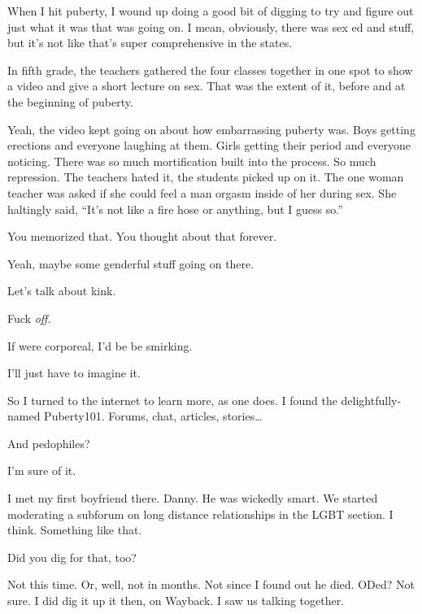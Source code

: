 \begin{paracol}{2}
\begin{leftcolumn}
\noindent When I hit puberty, I wound up doing a good bit of digging to try and figure out just what it was that was going on. I mean, obviously, there was sex ed and stuff, but it's not like that's super comprehensive in the states.

\begin{ally}
In fifth grade, the teachers gathered the four classes together in one spot to show a video and give a short lecture on sex. That was the extent of it, before and at the beginning of puberty.
\end{ally}
Yeah, the video kept going on about how embarrassing puberty was. Boys getting erections and everyone laughing at them. Girls getting their period and everyone noticing. There was so much mortification built into the process. So much repression. The teachers hated it, the students picked up on it. The one woman teacher was asked if she could feel a man orgasm inside of her during sex. She haltingly said, ``It's not like a fire hose or anything, but I guess so.''

\begin{ally}
You memorized that. You thought about that forever.
\end{ally}
Yeah, maybe some genderful stuff going on there.

\begin{ally}
Let's talk about kink.
\end{ally}
Fuck \emph{off}.

\begin{ally}
If were corporeal, I'd be be smirking.
\end{ally}
I'll just have to imagine it.

So I turned to the internet to learn more, as one does. I found the delightfully-named Puberty101. Forums, chat, articles, stories\ldots{}

\begin{ally}
And pedophiles?
\end{ally}
I'm sure of it.

I met my first boyfriend there. Danny. He was wickedly smart. We started moderating a subforum on long distance relationships in the LGBT section. I think. Something like that.

\begin{ally}
Did you dig for that, too?
\end{ally}
Not this time. Or, well, not in months. Not since I found out he died. ODed? Not sure. I did dig it up it then, on Wayback. I saw us talking together.


\end{leftcolumn}
\end{paracol}
